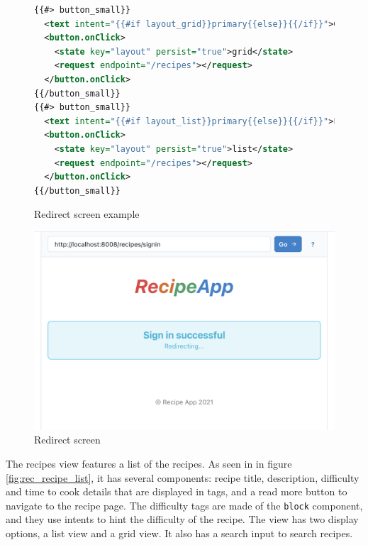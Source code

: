 \begin{figure}[htb]
\begin{minipage}{\linewidth}
\begin{lstlisting}[language=xml]
{{#> button_small}}
  <text intent="{{#if layout_grid}}primary{{else}}{{/if}}">Grid</text>
  <button.onClick>
    <state key="layout" persist="true">grid</state>
    <request endpoint="/recipes"></request>
  </button.onClick>
{{/button_small}}
{{#> button_small}}
  <text intent="{{#if layout_list}}primary{{else}}{{/if}}">List</text>
  <button.onClick>
    <state key="layout" persist="true">list</state>
    <request endpoint="/recipes"></request>
  </button.onClick>
{{/button_small}}
\end{lstlisting}
\end{minipage}
\caption{Redirect screen example}%
\label{fig:rec_display_options}%
\end{figure}

\begin{figure}[htb]
  \centering
  \includegraphics[width=12.4cm]{thesis/paper/images/rec_redirect.png}
  \caption{Redirect screen}%
  \label{fig:rec_redirect}%
\end{figure}

The recipes view features a list of the recipes. As seen in in figure \ref{fig:rec_recipe_list}, it has several components: recipe title, description, difficulty and time to cook details that are displayed in tags, and a read more button to navigate to the recipe page. The difficulty tags are made of the \texttt{block} component, and they use intents to hint the difficulty of the recipe. The view has two display options, a list view and a grid view. It also has a search input to search recipes.

